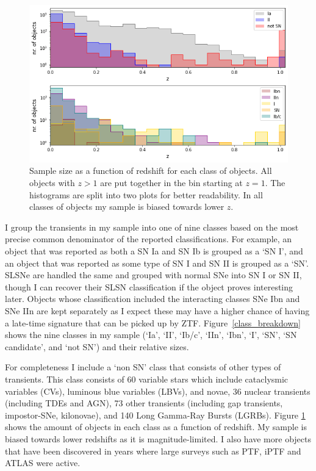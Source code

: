 \documentclass[a4paper,oneside,12pt, class=Latex/Classes/PhDthesisPSnPDF, crop=false]{standalone}
\begin{document}
\begin{figure}
    \centering
    \includegraphics[width=\textwidth]{../Images/chapter_4/sample_hists_vert.png}
    \caption{Sample size as a function of redshift for each class of objects. All objects with $z>1$ are put together in the bin starting at $z=1$. The histograms are split into two plots for better readability. In all classes of objects my sample is biased towards lower $z$.}
    \label{class_hists}    
\end{figure}

I group the transients in my sample into one of nine classes based on the most precise common denominator of the reported classifications. For example, an object that was reported as both a SN Ia and SN Ib is grouped as a `SN I', and an object that was reported as some type of SN I and SN II is grouped as a `SN'. SLSNe are handled the same and grouped with normal SNe into SN I or SN II, though I can recover their SLSN classification if the object proves interesting later. Objects whose classification included the interacting classes SNe Ibn and SNe IIn are kept separately as I expect these may have a higher chance of having a late-time signature that can be picked up by ZTF. Figure~\ref{class_breakdown} shows the nine classes in my sample (`Ia', `II', `Ib/c', `IIn', `Ibn', `I', `SN', `SN candidate', and `not SN') and their relative sizes.

For completeness I include a `non SN' class that consists of other types of transients. This class consists of 60 variable stars which include cataclysmic variables (CVs), luminous blue variables (LBVs), and novae, 36 nuclear transients (including TDEs and AGN), 73 other transients (including gap transients, impostor-SNe, kilonovae), and 140 Long Gamma-Ray Bursts (LGRBs).
Figure \ref{class_hists} shows the amount of objects in each class as a function of redshift. My sample is biased towards lower redshifts as it is magnitude-limited. I also have more objects that have been discovered in years where large surveys such as PTF, iPTF and ATLAS were active.
\end{document}
